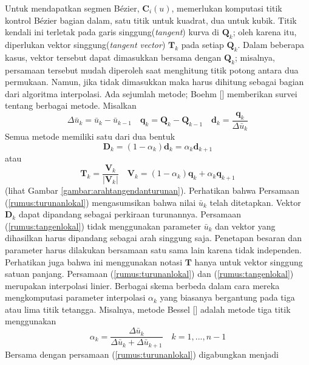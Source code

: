 Untuk mendapatkan segmen Bézier, $\textbf{C}_{i}(u)$, 
memerlukan komputasi titik kontrol Bézier bagian dalam, 
satu titik untuk kuadrat, dua untuk kubik. Titik kendali 
ini terletak pada garis singgung(\textit{tangent}) kurva di 
$\textbf{Q}_k$; oleh karena itu, diperlukan vektor 
singgung(\textit{tangent vector}) $\textbf{T}_k$ pada 
setiap $\textbf{Q}_k$. Dalam beberapa kasus, vektor 
tersebut dapat dimasukkan bersama dengan $\textbf{Q}_k$; 
misalnya, persamaan tersebut mudah diperoleh saat 
menghitung titik potong antara dua permukaan. Namun, 
jika tidak dimasukkan maka harus dihitung sebagai bagian 
dari algoritma interpolasi. Ada sejumlah metode; Boehm 
[\cite{BOHM19841}] memberikan survei tentang berbagai 
metode. Misalkan
\[\Delta\bar{u}_k = \bar{u}_k - \bar{u}_{k-1} \quad
\textbf{q}_k = \textbf{Q}_k - \textbf{Q}_{k-1} \quad
\textbf{d}_k = \frac{\textbf{q}_k}{\Delta\bar{u}_k}
\]
Semua metode memiliki satu dari dua bentuk
\begin{equation}
	\textbf{D}_k = (1 - \alpha_k)\textbf{d}_k = \alpha_{k}\textbf{d}_{k+1}
	\label{rumus:turunanlokal} 
\end{equation}
atau
\begin{equation}
	\textbf{T}_k = \frac{\textbf{V}_k}{|\textbf{V}_k|} \quad
	\textbf{V}_k = (1 - \alpha_k)\textbf{q}_k + \alpha_{k}\textbf{q}_{k+1}
	\label{rumus:tangenlokal} 
\end{equation}
(lihat Gambar \ref{gambar:arahtangendanturunan}). 
Perhatikan bahwa Persamaan (\ref{rumus:turunanlokal}) 
mengasumsikan bahwa nilai $\bar{u}_k$ telah ditetapkan. 
Vektor $\textbf{D}_k$ dapat dipandang sebagai perkiraan 
turunannya. Persamaan (\ref{rumus:tangenlokal}) tidak 
menggunakan parameter $\bar{u}_k$ dan vektor yang 
dihasilkan harus dipandang sebagai arah singgung saja. 
Penetapan besaran dan parameter harus dilakukan bersamaan 
satu sama lain karena tidak independen. Perhatikan 
juga bahwa ini menggunakan notasi $\textbf{T}$ hanya 
untuk vektor singgung satuan panjang. Persamaan 
(\ref{rumus:turunanlokal}) dan (\ref{rumus:tangenlokal}) 
merupakan interpolasi linier. Berbagai skema berbeda 
dalam cara mereka mengkomputasi parameter interpolasi 
$\alpha_k$ yang biasanya bergantung pada tiga atau 
lima titik tetangga. Misalnya, metode Bessel [\cite{DeBoor}] 
adalah metode tiga titik menggunakan
\begin{equation}
	\alpha_k = \frac{\Delta\bar{u}_k}
	{\Delta\bar{u}_k + \Delta\bar{u}_{k+1}} \quad
	k = 1,...,n-1
	\label{rumus:alfalokal} 
\end{equation}
Bersama dengan persamaan (\ref{rumus:turunanlokal}) digabungkan menjadi
